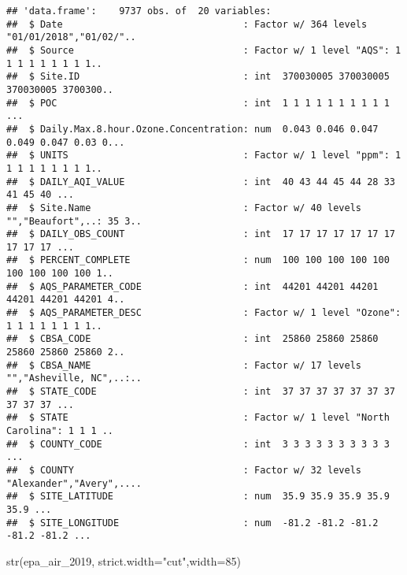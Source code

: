 \documentclass[
]{article}
\newenvironment{Shaded}{\begin{snugshade}}{\end{snugshade}}
\newcommand{\AttributeTok}[1]{\textcolor[rgb]{0.77,0.63,0.00}{#1}}
\newcommand{\DecValTok}[1]{\textcolor[rgb]{0.00,0.00,0.81}{#1}}
\newcommand{\FunctionTok}[1]{\textcolor[rgb]{0.00,0.00,0.00}{#1}}
\newcommand{\NormalTok}[1]{#1}
\newcommand{\StringTok}[1]{\textcolor[rgb]{0.31,0.60,0.02}{#1}}
\begin{document}
\begin{verbatim}
## 'data.frame':    9737 obs. of  20 variables:
##  $ Date                                : Factor w/ 364 levels "01/01/2018","01/02/"..
##  $ Source                              : Factor w/ 1 level "AQS": 1 1 1 1 1 1 1 1 1..
##  $ Site.ID                             : int  370030005 370030005 370030005 3700300..
##  $ POC                                 : int  1 1 1 1 1 1 1 1 1 1 ...
##  $ Daily.Max.8.hour.Ozone.Concentration: num  0.043 0.046 0.047 0.049 0.047 0.03 0...
##  $ UNITS                               : Factor w/ 1 level "ppm": 1 1 1 1 1 1 1 1 1..
##  $ DAILY_AQI_VALUE                     : int  40 43 44 45 44 28 33 41 45 40 ...
##  $ Site.Name                           : Factor w/ 40 levels "","Beaufort",..: 35 3..
##  $ DAILY_OBS_COUNT                     : int  17 17 17 17 17 17 17 17 17 17 ...
##  $ PERCENT_COMPLETE                    : num  100 100 100 100 100 100 100 100 100 1..
##  $ AQS_PARAMETER_CODE                  : int  44201 44201 44201 44201 44201 44201 4..
##  $ AQS_PARAMETER_DESC                  : Factor w/ 1 level "Ozone": 1 1 1 1 1 1 1 1..
##  $ CBSA_CODE                           : int  25860 25860 25860 25860 25860 25860 2..
##  $ CBSA_NAME                           : Factor w/ 17 levels "","Asheville, NC",..:..
##  $ STATE_CODE                          : int  37 37 37 37 37 37 37 37 37 37 ...
##  $ STATE                               : Factor w/ 1 level "North Carolina": 1 1 1 ..
##  $ COUNTY_CODE                         : int  3 3 3 3 3 3 3 3 3 3 ...
##  $ COUNTY                              : Factor w/ 32 levels "Alexander","Avery",....
##  $ SITE_LATITUDE                       : num  35.9 35.9 35.9 35.9 35.9 ...
##  $ SITE_LONGITUDE                      : num  -81.2 -81.2 -81.2 -81.2 -81.2 ...
\end{verbatim}

\begin{Shaded}
\begin{Highlighting}[]
\FunctionTok{str}\NormalTok{(epa\_air\_2019,  }\AttributeTok{strict.width=}\StringTok{"cut"}\NormalTok{,}\AttributeTok{width=}\DecValTok{85}\NormalTok{)}
\end{Highlighting}
\end{Shaded}
\end{document}
